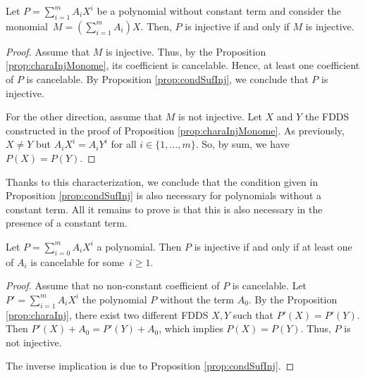 	\begin{proposition}\label{prop:charaInj}
		Let $P = \sum_{i=1}^{m} A_i X^{i}$ be a polynomial without constant term and consider the monomial~$M = (\sum_{i=1}^{m} A_i)X$. Then, $P$ is injective if and only if $M$ is injective.
	\end{proposition}
	
	\begin{proof}
		Assume that $M$ is injective.
		Thus, by the Proposition \ref{prop:charaInjMonome}, its coefficient is cancelable.
		Hence, at least one coefficient of $P$ is cancelable.
		By Proposition \ref{prop:condSufInj}, we conclude that $P$ is injective. 
		
		For the other direction, assume that $M$ is not injective.
		Let $X$ and $Y$ the FDDS constructed in the proof of Proposition \ref{prop:charaInjMonome}.
		As previously, $X \neq Y$ but $A_i X^i = A_i Y^i$ for all $i \in \{1,\ldots, m\}$. 
		So, by sum, we have $P(X) = P(Y)$.
	\end{proof}
	
	Thanks to this characterization, we conclude that the condition given in Proposition \ref{prop:condSufInj} is also necessary for polynomials without a constant term.
	All it remains to prove is that this is also necessary in the presence of a constant term.
	
	\begin{theorem}\label{th:charaInjPoly}
		Let $P = \sum_{i=0}^{m} A_i X^{i}$ a polynomial. Then $P$ is injective if and only if at least one of $A_i$ is cancelable for some~$i \ge 1$.
	\end{theorem}
	
	\begin{proof}
                Assume that no non-constant coefficient of $P$ is cancelable.
		Let $P' = \sum_{i=1}^{m} A_i X^{i}$ the polynomial $P$ without the term $A_0$.
		By the Proposition \ref{prop:charaInj}, there exist two different FDDS $X,Y$ such that $P'(X) = P'(Y)$.
		Then $P'(X) + A_0 = P'(Y) + A_0$, which implies $P(X) = P(Y)$. 
		Thus, $P$ is not injective.

		The inverse implication is due to Proposition \ref{prop:condSufInj}.
	\end{proof}
